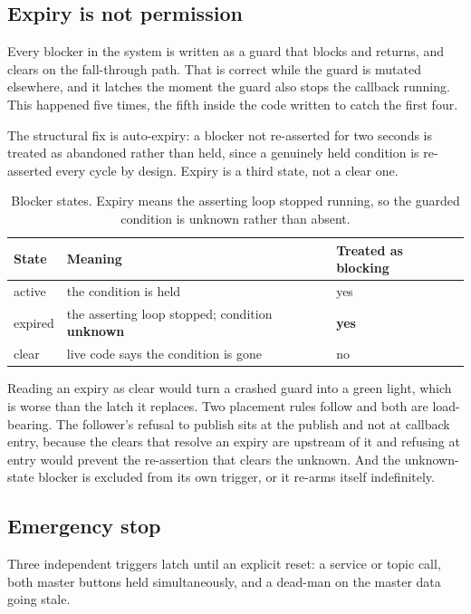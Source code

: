 \subsection{Expiry is not permission}

Every blocker in the system is written as a guard that blocks and returns, and
clears on the fall-through path. That is correct while the guard is mutated
elsewhere, and it latches the moment the guard also stops the callback
running. This happened five times, the fifth inside the code written to catch
the first four.

The structural fix is auto-expiry: a blocker not re-asserted for two seconds
is treated as abandoned rather than held, since a genuinely held condition is
re-asserted every cycle by design. Expiry is a third state, not a clear one.

\begin{table}[htbp]
  \centering
  \caption{Blocker states. Expiry means the asserting loop stopped running, so
  the guarded condition is unknown rather than absent.}
  \label{tab:blockstates}
  \begin{tabular}{@{}lll@{}}
    \toprule
    State & Meaning & Treated as blocking \\
    \midrule
    active  & the condition is held & yes \\
    expired & the asserting loop stopped; condition \textbf{unknown} & \textbf{yes} \\
    clear   & live code says the condition is gone & no \\
    \bottomrule
  \end{tabular}
\end{table}

Reading an expiry as clear would turn a crashed guard into a green light,
which is worse than the latch it replaces. Two placement rules follow and both
are load-bearing. The follower's refusal to publish sits at the publish and
not at callback entry, because the clears that resolve an expiry are upstream
of it and refusing at entry would prevent the re-assertion that clears the
unknown. And the unknown-state blocker is excluded from its own trigger, or it
re-arms itself indefinitely.

\subsection{Emergency stop}

Three independent triggers latch until an explicit reset: a service or topic
call, both master buttons held simultaneously, and a dead-man on the master
data going stale.

